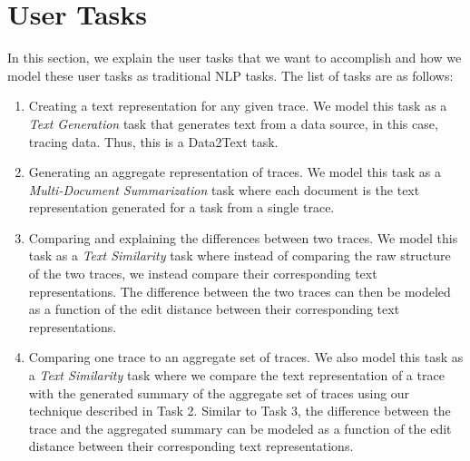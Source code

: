 \section{User Tasks}
\label{sec:tasks}

In this section, we explain the user tasks that we want to accomplish and how we model
these user tasks as traditional NLP tasks. The list of tasks are as follows:

\begin{enumerate}
    \item Creating a text representation for any given trace. We model this task as a \emph{Text Generation} task
        that generates text from a data source, in this case, tracing data. Thus, this is a Data2Text task.
    \item Generating an aggregate representation of traces. We model this task as a \emph{Multi-Document Summarization} task
        where each document is the text representation generated for a task from a single trace.
    \item Comparing and explaining the differences between two traces. We model this task as a \emph{Text Similarity} task
        where instead of comparing the raw structure of the two traces, we instead compare their corresponding text representations. The
        difference between the two traces can then be modeled as a function of the edit distance between their corresponding text representations.
    \item Comparing one trace to an aggregate set of traces. We also model this task as a \emph{Text Similarity} task
        where we compare the text representation of a trace with the generated summary of the aggregate set of traces using our technique described
        in Task 2. Similar to Task 3, the difference between the trace and the aggregated summary can be modeled as a function of the edit distance
        between their corresponding text representations.
\end{enumerate}